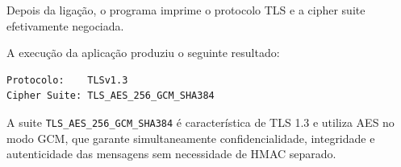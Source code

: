 Depois da ligação, o programa imprime o protocolo TLS e a cipher suite efetivamente negociada.

A execução da aplicação produziu o seguinte resultado:

\begin{verbatim}
Protocolo:    TLSv1.3
Cipher Suite: TLS_AES_256_GCM_SHA384
\end{verbatim}

A suite \texttt{TLS\_AES\_256\_GCM\_SHA384} é característica de TLS 1.3 e utiliza AES no modo GCM, que garante simultaneamente confidencialidade, integridade e autenticidade das mensagens sem necessidade de HMAC separado.
